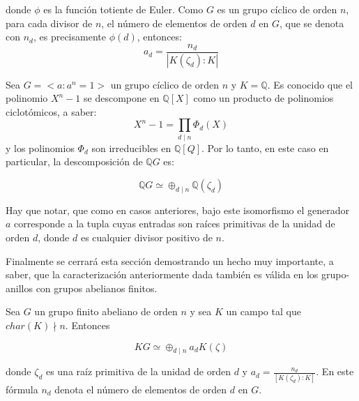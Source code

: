 donde $\phi$ es la función totiente de Euler. Como $G$ es un grupo cíclico de orden $n$, para cada divisor de $n$, el número de elementos de orden $d$ en $G$, que se denota con $n_d$, es precisamente $\phi(d)$, entonces:
\[ a_d = \frac{n_d}{| K(\zeta_d) : K|}  \]
\begin{ejemplo}\label{ejem:descomposicionRacional}
Sea $G = < a \colon a^n = 1 >$  un grupo cíclico de orden $n$ y $K = \mathds{Q} $. Es conocido que el polinomio $X^n-1$ se descompone en $\mathds{Q}[X]$ como un producto de polinomios ciclotómicos, a saber:
\[ X^n -1 = \prod_{d \mid n}\Phi_d(X)  \]
y los polinomios $\Phi_d$ son irreducibles en $\mathds{Q}[Q]$. Por lo tanto, en este caso en particular, la descomposición de $\mathds{Q}G$ es:

\[ \mathds{Q}G \simeq \oplus_{d\mid n} \mathds{Q}(\zeta_d)  \]

Hay que notar, que como en casos anteriores, bajo este isomorfismo el generador $a$ corresponde a la tupla cuyas entradas son raíces primitivas de la unidad de orden $d$, donde $d$ es cualquier divisor positivo de $n$. 
\end{ejemplo}

Finalmente se cerrará esta sección demostrando un hecho muy importante, a saber, que la caracterización anteriormente dada  también es válida en los grupo-anillos con grupos  abelianos finitos.

\begin{teorema}\label{teo:Perlis-Walker}
Sea $G$ un grupo finito abeliano de orden $n$ y sea $K$ un campo tal que $char(K)\nmid n$. Entonces

\[  KG \simeq \oplus_{d\mid n}a_dK(\zeta) \]

donde $\zeta_d$ es una raíz primitiva de la unidad de orden $d$ y $a_d = \frac{n_d}{[K(\zeta_d):K]}$. En este fórmula $n_d$ denota el número de elementos de orden $d$ en $G$.
\end{teorema} 

